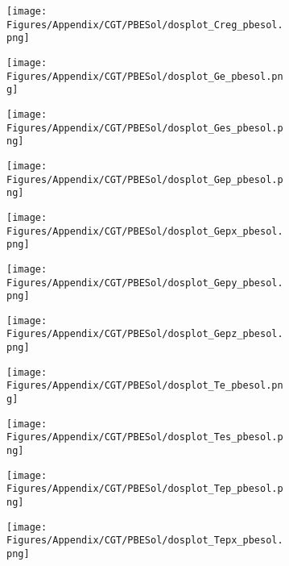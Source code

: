 \begin{figure}[H]
\begin{subfigure}{0.24\textwidth}
    \texttt{[image: Figures/Appendix/CGT/PBESol/dosplot\_Creg\_pbesol.png]}
    \label{dosplot_Creg_pbesol}
\end{subfigure}
\hfill
\begin{subfigure}{0.24\textwidth}
    \texttt{[image: Figures/Appendix/CGT/PBESol/dosplot\_Ge\_pbesol.png]}
    \label{dosplot_Ge_pbesol}
\end{subfigure}
\hfill
\begin{subfigure}{0.24\textwidth}
    \texttt{[image: Figures/Appendix/CGT/PBESol/dosplot\_Ges\_pbesol.png]}
    \label{dosplot_Ges_pbesol}
\end{subfigure}
\hfill
\begin{subfigure}{0.24\textwidth}
    \texttt{[image: Figures/Appendix/CGT/PBESol/dosplot\_Gep\_pbesol.png]}
    \label{dosplot_Gep_pbesol}
\end{subfigure}
\hfill
\begin{subfigure}{0.24\textwidth}
    \texttt{[image: Figures/Appendix/CGT/PBESol/dosplot\_Gepx\_pbesol.png]}
    \label{dosplot_Gepx_pbesol}
\end{subfigure}
\hfill
\begin{subfigure}{0.24\textwidth}
    \texttt{[image: Figures/Appendix/CGT/PBESol/dosplot\_Gepy\_pbesol.png]}
    \label{dosplot_Gepy_pbesol}
\end{subfigure}
\hfill
\begin{subfigure}{0.24\textwidth}
    \texttt{[image: Figures/Appendix/CGT/PBESol/dosplot\_Gepz\_pbesol.png]}
    \label{dosplot_Gepz_pbesol}
\end{subfigure}
\hfill
\begin{subfigure}{0.24\textwidth}
    \texttt{[image: Figures/Appendix/CGT/PBESol/dosplot\_Te\_pbesol.png]}
    \label{dosplot_Te_pbesol}
\end{subfigure}
\hfill
\begin{subfigure}{0.24\textwidth}
    \texttt{[image: Figures/Appendix/CGT/PBESol/dosplot\_Tes\_pbesol.png]}
    \label{dosplot_Tes_pbesol}
\end{subfigure}
\hfill
\begin{subfigure}{0.24\textwidth}
    \texttt{[image: Figures/Appendix/CGT/PBESol/dosplot\_Tep\_pbesol.png]}
    \label{dosplot_Tep_pbesol}
\end{subfigure}
\hfill
\begin{subfigure}{0.24\textwidth}
    \texttt{[image: Figures/Appendix/CGT/PBESol/dosplot\_Tepx\_pbesol.png]}

\end{subfigure}
\end{figure}
